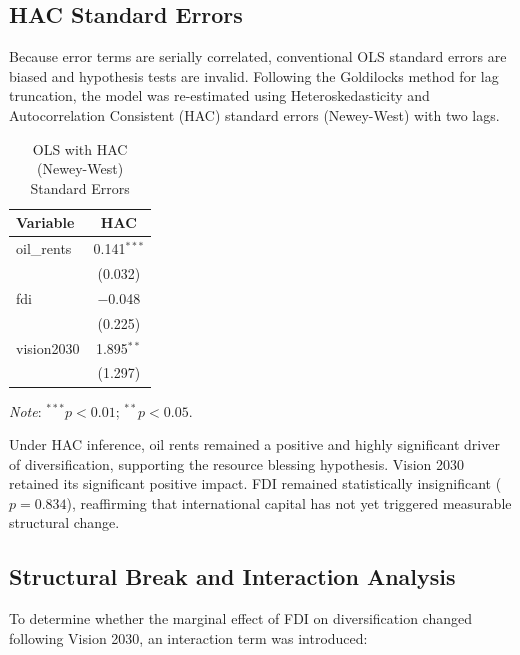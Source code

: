 \documentclass[12pt, a4paper]{article}
\begin{document}
\subsection{HAC Standard Errors}

Because error terms are serially correlated, conventional OLS standard errors are biased and hypothesis tests are invalid. Following the Goldilocks method for lag truncation, the model was re-estimated using Heteroskedasticity and Autocorrelation Consistent (HAC) standard errors (Newey-West) with two lags.

\begin{table}[H]
\centering
\begin{threeparttable}
\caption{OLS with HAC (Newey-West) Standard Errors}
\label{tab:hac}
\begin{tabular}{lc}
    \toprule
    \textbf{Variable} & \textbf{HAC} \\
    \midrule
    oil\_rents & 0.141$^{***}$ \\
               & (0.032)       \\[4pt]
    fdi        & $-$0.048      \\
               & (0.225)       \\[4pt]
    vision2030 & 1.895$^{**}$  \\
               & (1.297)       \\
    \bottomrule
\end{tabular}
\begin{tablenotes}
    \small
    \item \textit{Note}: $^{***}p < 0.01$; $^{**}p < 0.05$.
\end{tablenotes}
\end{threeparttable}
\end{table}

Under HAC inference, oil rents remained a positive and highly significant driver of diversification, supporting the resource blessing hypothesis. Vision 2030 retained its significant positive impact. FDI remained statistically insignificant ($p = 0.834$), reaffirming that international capital has not yet triggered measurable structural change.

\subsection{Structural Break and Interaction Analysis}

To determine whether the marginal effect of FDI on diversification changed following Vision 2030, an interaction term was introduced:
\end{document}
